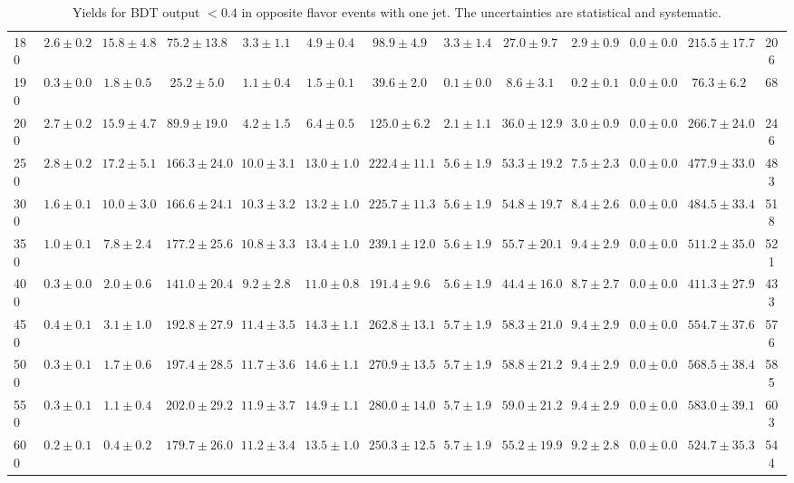 \begin{table}
{\begin{center}
\begin{tabular}{l | c c | c c c c c c c c  | c c}
180 & $2.6\pm0.2$ & $15.8\pm4.8$ & $75.2\pm13.8$ & $3.3\pm1.1$ & $4.9\pm0.4$ & $98.9\pm4.9$ & $3.3\pm1.4$ & $27.0\pm9.7$ & $2.9\pm0.9$ & $0.0\pm0.0$ & $215.5\pm17.7$ & 206 \\
190 & $0.3\pm0.0$ & $1.8\pm0.5$ & $25.2\pm5.0$ & $1.1\pm0.4$ & $1.5\pm0.1$ & $39.6\pm2.0$ & $0.1\pm0.0$ & $8.6\pm3.1$ & $0.2\pm0.1$ & $0.0\pm0.0$ & $76.3\pm6.2$ & 68 \\
200 & $2.7\pm0.2$ & $15.9\pm4.7$ & $89.9\pm19.0$ & $4.2\pm1.5$ & $6.4\pm0.5$ & $125.0\pm6.2$ & $2.1\pm1.1$ & $36.0\pm12.9$ & $3.0\pm0.9$ & $0.0\pm0.0$ & $266.7\pm24.0$ & 246 \\
250 & $2.8\pm0.2$ & $17.2\pm5.1$ & $166.3\pm24.0$ & $10.0\pm3.1$ & $13.0\pm1.0$ & $222.4\pm11.1$ & $5.6\pm1.9$ & $53.3\pm19.2$ & $7.5\pm2.3$ & $0.0\pm0.0$ & $477.9\pm33.0$ & 483 \\
300 & $1.6\pm0.1$ & $10.0\pm3.0$ & $166.6\pm24.1$ & $10.3\pm3.2$ & $13.2\pm1.0$ & $225.7\pm11.3$ & $5.6\pm1.9$ & $54.8\pm19.7$ & $8.4\pm2.6$ & $0.0\pm0.0$ & $484.5\pm33.4$ & 518 \\
350 & $1.0\pm0.1$ & $7.8\pm2.4$ & $177.2\pm25.6$ & $10.8\pm3.3$ & $13.4\pm1.0$ & $239.1\pm12.0$ & $5.6\pm1.9$ & $55.7\pm20.1$ & $9.4\pm2.9$ & $0.0\pm0.0$ & $511.2\pm35.0$ & 521 \\
400 & $0.3\pm0.0$ & $2.0\pm0.6$ & $141.0\pm20.4$ & $9.2\pm2.8$ & $11.0\pm0.8$ & $191.4\pm9.6$ & $5.6\pm1.9$ & $44.4\pm16.0$ & $8.7\pm2.7$ & $0.0\pm0.0$ & $411.3\pm27.9$ & 433 \\
450 & $0.4\pm0.1$ & $3.1\pm1.0$ & $192.8\pm27.9$ & $11.4\pm3.5$ & $14.3\pm1.1$ & $262.8\pm13.1$ & $5.7\pm1.9$ & $58.3\pm21.0$ & $9.4\pm2.9$ & $0.0\pm0.0$ & $554.7\pm37.6$ & 576 \\
500 & $0.3\pm0.1$ & $1.7\pm0.6$ & $197.4\pm28.5$ & $11.7\pm3.6$ & $14.6\pm1.1$ & $270.9\pm13.5$ & $5.7\pm1.9$ & $58.8\pm21.2$ & $9.4\pm2.9$ & $0.0\pm0.0$ & $568.5\pm38.4$ & 585 \\
550 & $0.3\pm0.1$ & $1.1\pm0.4$ & $202.0\pm29.2$ & $11.9\pm3.7$ & $14.9\pm1.1$ & $280.0\pm14.0$ & $5.7\pm1.9$ & $59.0\pm21.2$ & $9.4\pm2.9$ & $0.0\pm0.0$ & $583.0\pm39.1$ & 603 \\
600 & $0.2\pm0.1$ & $0.4\pm0.2$ & $179.7\pm26.0$ & $11.2\pm3.4$ & $13.5\pm1.0$ & $250.3\pm12.5$ & $5.7\pm1.9$ & $55.2\pm19.9$ & $9.2\pm2.8$ & $0.0\pm0.0$ & $524.7\pm35.3$ & 544 \\
\hline
\end{tabular}
\end{center}
\caption{Yields for BDT output $<0.4$ in opposite flavor events with one jet. The uncertainties are statistical and systematic.\label{tab:yields_bdtlo_1j}}}
\end{table}

